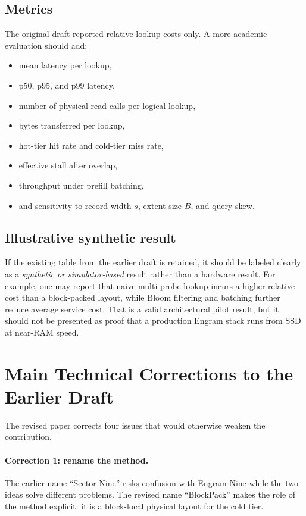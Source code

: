 \documentclass[11pt]{article}
\begin{document}
\subsection{Metrics}
The original draft reported relative lookup costs only. A more academic evaluation should add:
\begin{itemize}[leftmargin=1.5em]
    \item mean latency per lookup,
    \item p50, p95, and p99 latency,
    \item number of physical read calls per logical lookup,
    \item bytes transferred per lookup,
    \item hot-tier hit rate and cold-tier miss rate,
    \item effective stall after overlap,
    \item throughput under prefill batching,
    \item and sensitivity to record width $s$, extent size $B$, and query skew.
\end{itemize}

\subsection{Illustrative synthetic result}
If the existing table from the earlier draft is retained, it should be labeled clearly as a \emph{synthetic or simulator-based} result rather than a hardware result. For example, one may report that naive multi-probe lookup incurs a higher relative cost than a block-packed layout, while Bloom filtering and batching further reduce average service cost. That is a valid architectural pilot result, but it should not be presented as proof that a production Engram stack runs from SSD at near-RAM speed.

\section{Main Technical Corrections to the Earlier Draft}
The revised paper corrects four issues that would otherwise weaken the contribution.

\paragraph{Correction 1: rename the method.}
The earlier name ``Sector-Nine'' risks confusion with Engram-Nine while the two ideas solve different problems. The revised name ``BlockPack'' makes the role of the method explicit: it is a block-local physical layout for the cold tier.
\end{document}
